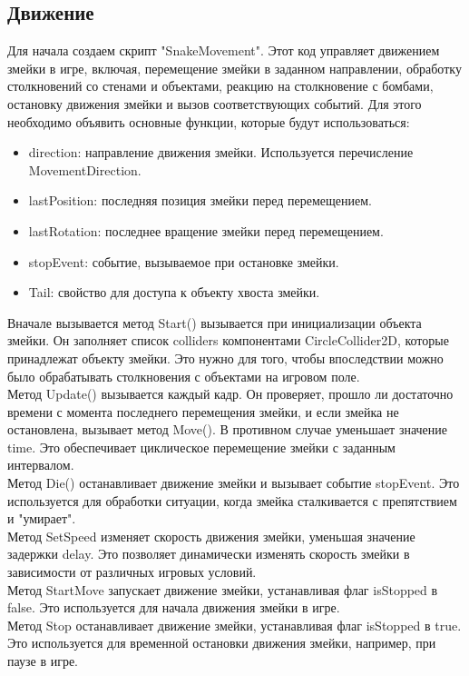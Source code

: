 \subsection{Движение}
Для начала создаем скрипт "SnakeMovement". Этот код управляет движением змейки в игре, включая, перемещение змейки в заданном направлении, обработку столкновений со стенами и объектами, реакцию на столкновение с бомбами, остановку движения змейки и вызов соответствующих событий.
Для этого необходимо объявить основные функции, которые будут использоваться:
\begin{itemize}
    \item direction: направление движения змейки. Используется перечисление MovementDirection.
    \item lastPosition: последняя позиция змейки перед перемещением.
    \item lastRotation: последнее вращение змейки перед перемещением.
    \item stopEvent: событие, вызываемое при остановке змейки.
    \item Tail: свойство для доступа к объекту хвоста змейки.
\end{itemize}
Вначале вызывается метод Start() вызывается при инициализации объекта змейки. Он заполняет список colliders компонентами CircleCollider2D, которые принадлежат объекту змейки. Это нужно для того, чтобы впоследствии можно было обрабатывать столкновения с объектами на игровом поле.\\
Метод Update() вызывается каждый кадр. Он проверяет, прошло ли достаточно времени с момента последнего перемещения змейки, и если змейка не остановлена, вызывает метод Move(). В противном случае уменьшает значение time. Это обеспечивает циклическое перемещение змейки с заданным интервалом.\\
Метод Die() останавливает движение змейки и вызывает событие stopEvent. Это используется для обработки ситуации, когда змейка сталкивается с препятствием и "умирает".\\
Метод SetSpeed изменяет скорость движения змейки, уменьшая значение задержки delay. Это позволяет динамически изменять скорость змейки в зависимости от различных игровых условий.\\
Метод StartMove запускает движение змейки, устанавливая флаг isStopped в false. Это используется для начала движения змейки в игре.\\
Метод Stop останавливает движение змейки, устанавливая флаг isStopped в true. Это используется для временной остановки движения змейки, например, при паузе в игре.\\
